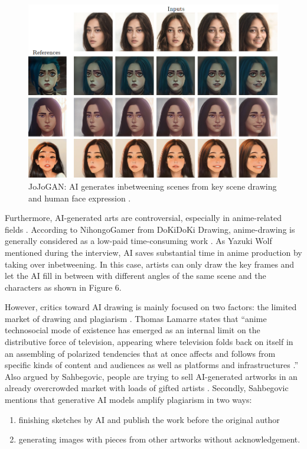 \begin{figure}[h]
    \includegraphics[width=\textwidth]{img/JoJo-2.png}
    \caption{
        JoJoGAN: AI generates inbetweening scenes from key scene drawing and human face expression \cite{chong2021jojogan}.
    }
\end{figure}
Furthermore, AI-generated arts are controversial,
especially in anime-related fields \cite{Sahbegovic2022anime}.
According to NihongoGamer from DoKiDoKi Drawing,
anime-drawing is generally considered as a low-paid time-consuming work \cite{NihongoGamer2022drawing}.
As Yazuki Wolf mentioned during the interview,
AI saves substantial time in anime production by taking over inbetweening.
In this case, artists can only draw the key frames and let the AI fill in between with different angles of the same scene and the characters as shown in Figure 6.

However, critics toward AI drawing is mainly focused on two factors:
the limited market of drawing and plagiarism \cite{Sahbegovic2022anime}.
Thomas Lamarre states that 
``anime technosocial mode of existence has emerged as an internal limit on the
distributive force of television, appearing where television folds back on itself
in an assembling of polarized tendencies that at once affects and follows from
specific kinds of content and audiences as well as platforms and infrastructures \cite{Lamarre2018Anime}.''
Also argued by Sahbegovic,
people are trying to sell AI-generated artworks in an already overcrowded market
with loads of gifted artists \cite{Sahbegovic2022anime}.
Secondly, Sahbegovic mentions that generative AI models amplify plagiarism in two ways:
\begin{enumerate}
    \item finishing sketches by AI and publish the work before the original author
    \item generating images with pieces from other artworks without acknowledgement.
\end{enumerate}
   
